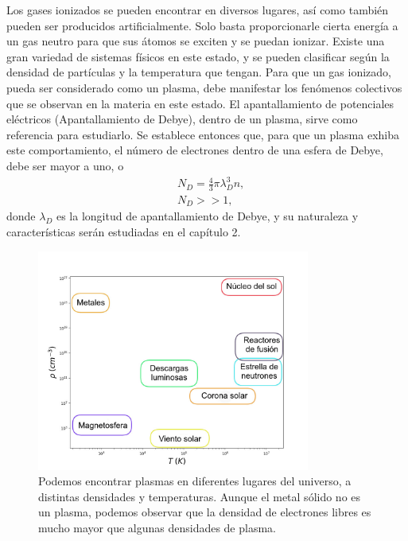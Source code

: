 \documentclass[../main.tex]{subfiles}
\begin{document}
Los gases ionizados se pueden encontrar en diversos lugares, así como también pueden ser producidos artificialmente. Solo basta proporcionarle cierta energía a un gas neutro para que sus átomos se exciten y se puedan ionizar. Existe una gran variedad de sistemas físicos en este estado, y se pueden clasificar según la densidad de partículas y la temperatura que tengan. Para que un gas ionizado, pueda ser considerado como un plasma, debe manifestar los fenómenos colectivos que se observan en la materia en este estado. El apantallamiento de potenciales eléctricos (Apantallamiento de Debye), dentro de un plasma, sirve como referencia para estudiarlo. Se establece entonces que, para que un plasma exhiba este comportamiento, el número de electrones dentro de una esfera de Debye, debe ser mayor a uno, o
\begin{align}
&N_D = \frac{4}{3}\pi \lambda_D^3 n, \\
&N_D >> 1,
\end{align}
donde $\lambda_D$ es la longitud de apantallamiento de Debye, y su naturaleza y características serán estudiadas en el capítulo 2.
 \begin{figure}[h] 
        \centering
        \includegraphics[width=0.8\textwidth]{Images/plasmas_dens_T.jpg}
        \caption{Podemos encontrar plasmas en diferentes lugares del universo, a distintas densidades y temperaturas. Aunque el metal sólido no es un plasma, podemos observar que la densidad de electrones libres es mucho mayor que algunas densidades de plasma.}
        \label{fig:plasmas_dens}
    \end{figure}
    
\end{document}
